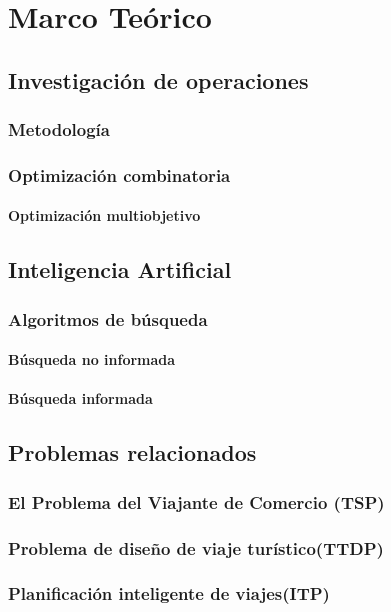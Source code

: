 \section{Marco Teórico}
\subsection{Investigación de operaciones}
\subsubsection{Metodología}
\subsubsection{Optimización combinatoria}
\paragraph{Optimización multiobjetivo}
 
\subsection{Inteligencia Artificial}
\subsubsection{Algoritmos de búsqueda}
\paragraph{Búsqueda no informada}
\paragraph{Búsqueda informada}

\subsection{Problemas relacionados}
\subsubsection{El Problema del Viajante de Comercio (TSP)}

\subsubsection{Problema de diseño de viaje turístico(TTDP)}
\subsubsection{Planificación inteligente de viajes(ITP)}
